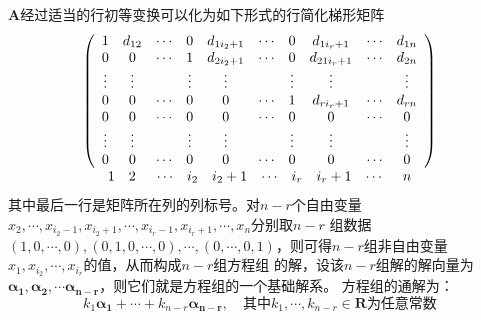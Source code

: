\begin{theorem}
    $\boldsymbol{A}$经过适当的行初等变换可以化为如下形式的行简化梯形矩阵
    $$\begin{array}{c}\left(\begin{array}{cccccccccc}
        1 & d_{12} & \cdots & 0 & d_{1i_2+1} & \cdots & 0 & d_{1i_r+1} & \cdots & d_{1n} \\
        0 & 0 & \cdots & 1 & d_{2i_2+1} & \cdots & 0 & d_{21i_r+1} & \cdots & d_{2n} \\
        \vdots & \vdots & & \vdots & \vdots &  & \vdots & \vdots &  & \vdots\\
        0 & 0 & \cdots & 0 & 0 & \cdots & 1 & d_{ri_r+1} & \cdots & d_{rn} \\
        0 & 0 & \cdots & 0 & 0 & \cdots & 0 & 0 & \cdots & 0 \\
        \vdots & \vdots & & \vdots & \vdots &  & \vdots & \vdots &  & \vdots\\
        0 & 0 & \cdots & 0 & 0 & \cdots & 0 & 0 & \cdots & 0 
    \end{array}\right)\\
    \begin{array}{lccccccccc}
        1 & 2{\color{white} 0} & \cdots & i_2 & i_2+1 & \cdots & i_r & i_r+1 & \cdots & {\color{white} 0} n
    \end{array}
    \end{array}$$
    其中最后一行是矩阵所在列的列标号。对$n-r$个自由变量$x_2,\cdots,x_{i_2-1},x_{i_2+1},\cdots, x_{i_r-1}, x_{i_r+1},\cdots, x_n $分别取$n-r$
    组数据$(1,0,\cdots,0),(0,1,0,\cdots,0),\cdots,(0,\cdots,0,1)$，则可得$n-r$组非自由变量$x_1,x_{i_2},\cdots,x_{i_r}$的值，从而构成$n-r$组方程组
    的解，设该$n-r$组解的解向量为$\boldsymbol{\alpha_1},\boldsymbol{\alpha_2},\cdots\boldsymbol{\alpha_{n-r}}$，则它们就是方程组的一个基础解系。
    方程组的通解为：
    $$k_1\boldsymbol{\alpha_1}+\cdots+k_{n-r}\boldsymbol{\alpha_{n-r}},\quad \mbox{其中}k_1,\cdots,k_{n-r}\in \mathbf{R}\mbox{为任意常数}$$
\end{theorem}
